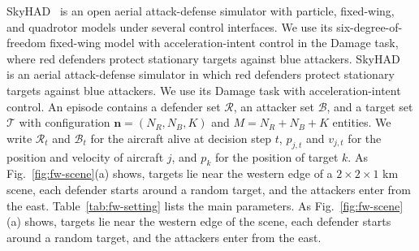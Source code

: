 \ifvehicledetail
SkyHAD~\cite{skyhad2026} is an open aerial attack-defense simulator with particle, fixed-wing, and quadrotor models under several control interfaces. We use its six-degree-of-freedom fixed-wing model with acceleration-intent control in the Damage task, where red defenders protect stationary targets against blue attackers.
\else
SkyHAD~\cite{skyhad2026} is an aerial attack-defense simulator in which red defenders protect stationary targets against blue attackers. We use its Damage task with acceleration-intent control.
\fi
An episode contains a defender set $\mathcal R$, an attacker set $\mathcal B$, and a target set $\mathcal T$ with configuration $\mathbf n=(N_R,N_B,K)$ and $M=N_R+N_B+K$ entities. We write $\mathcal R_t$ and $\mathcal B_t$ for the aircraft alive at decision step $t$, $p_{j,t}$ and $v_{j,t}$ for the position and velocity of aircraft $j$, and $p_k$ for the position of target $k$.
\ifvehicledetail
As Fig.~\ref{fig:fw-scene}(a) shows, targets lie near the western edge of a $2\times2\times1$ km scene, each defender starts around a random target, and the attackers enter from the east. Table~\ref{tab:fw-setting} lists the main parameters.
\else
As Fig.~\ref{fig:fw-scene}(a) shows, targets lie near the western edge of the scene, each defender starts around a random target, and the attackers enter from the east.
\fi

